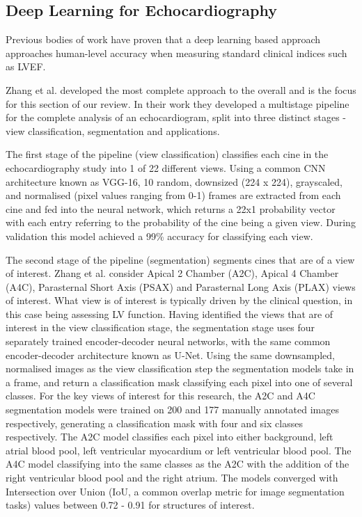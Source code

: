 \subsection{Deep Learning for Echocardiography}

Previous bodies of work \cite{zhangFullyAutomatedEchocardiogram2018}
\cite{leclercDeepLearningSegmentation2019} \cite{hewitt2019artificial} have
proven that a deep learning based approach approaches human-level accuracy when
measuring standard clinical indices such as LVEF. \newline

Zhang et al. developed the most complete approach to the overall and is the
focus for this section of our review. In their work they developed a multistage
pipeline for the complete analysis of an echocardiogram, split into three
distinct stages - view classification, segmentation and applications. \newline

The first stage of the pipeline (view classification) classifies each cine in
the echocardiography study into 1 of 22 different views. Using a common CNN
architecture known as VGG-16, 10 random, downsized (224 x 224), grayscaled, and
normalised (pixel values ranging from 0-1) frames are extracted from each cine
and fed into the neural network, which returns a 22x1 probability
vector with each entry referring to the probability of the cine being a given
view. During validation this model achieved a 99\% accuracy for classifying each
view.
\newline

The second stage of the pipeline (segmentation) segments cines that are of a
view of interest. Zhang et al. consider Apical 2 Chamber (A2C), Apical 4 Chamber
(A4C), Parasternal Short Axis (PSAX) and Parasternal Long Axis (PLAX) views of
interest. What view is of interest is typically driven by the clinical question,
in this case being assessing LV function. Having identified the views that are
of interest in the view classification stage, the segmentation stage uses four
separately trained encoder-decoder neural networks, with the same common
encoder-decoder architecture known as U-Net. Using the same downsampled,
normalised images as the view classification step the segmentation models take
in a frame, and return a classification mask classifying each pixel into one of
several classes. For the key views of interest for this research, the A2C and
A4C segmentation models were trained on 200 and 177 manually annotated images
respectively, generating a classification mask with four and six classes
respectively. The A2C model classifies each pixel into either background, left atrial
blood pool, left ventricular myocardium or left ventricular blood pool. The
A4C model classifying into the same classes as the A2C with the addition of the
right ventricular blood pool and the right atrium. The models converged with
Intersection over Union (IoU, a common overlap metric for image segmentation
tasks) values between 0.72 - 0.91 for structures of interest. \newline

